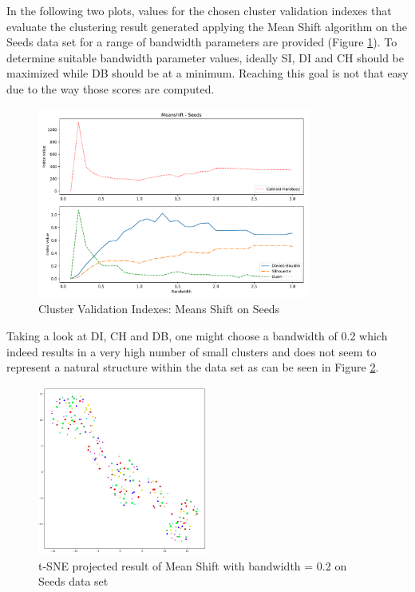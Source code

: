 In the following two plots, values for the chosen cluster validation indexes that evaluate the clustering result generated applying the Mean Shift algorithm on the Seeds data set for a range of bandwidth parameters are provided (Figure \ref{fig:mean_shift_seeds_indexes}).
To determine suitable bandwidth parameter values, ideally SI, DI and CH should be maximized while DB should be at a minimum. 
Reaching this goal is not that easy due to the way those scores are computed.
\newline
\begin{figure}[H]
\begin{center}
\includegraphics[width=0.8\textwidth]{images/Meanshift_-_Seeds.pdf}
\end{center}
\caption{Cluster Validation Indexes: Means Shift on Seeds}
\label{fig:mean_shift_seeds_indexes}
\end{figure}
Taking a look at DI, CH and DB, one might choose a bandwidth of 0.2 which indeed results in a very high number of small clusters and does not seem to represent a natural structure within the data set as can be seen in Figure \ref{fig:meanshift_seeds_clustering_tsne}.
\begin{figure}[H]
    \centering
    \includegraphics[width=0.5\textwidth]{images/Meanshift_Seeds_0_2.png}
    \caption{t-SNE projected result of Mean Shift with bandwidth = 0.2 on Seeds data set}
    \label{fig:meanshift_seeds_clustering_tsne}
\end{figure}


